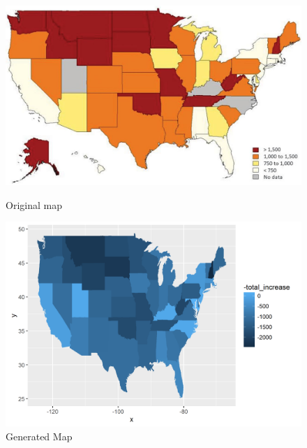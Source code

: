 \documentclass[12pt]{article}%
\begin{document}
\begin{figure}[htbb]
	\begin{minipage}[b]{0.5\linewidth}
		\centering
		\includegraphics[width=\linewidth]{figures/fig3_original.jpg}
		\caption{Original map}
		\label{fig:fig3_original}
	\end{minipage}
	\hspace{0.2cm}
	\begin{minipage}[b]{0.5\linewidth}
		\centering
		\includegraphics[width=\linewidth]{figures/fig3_generated.png}
		\caption{Generated Map}
		\label{fig:fig3_generated}
	\end{minipage}
\end{figure}
\end{document}
